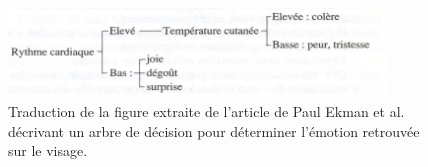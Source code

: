 \begin{figure}
  \centering
  \includegraphics[width=10cm]{./Chapitre1/figures/Ekman1983.png}
  \caption{Traduction de la figure extraite de l'article de Paul Ekman et al.~\cite{Ekman1983} décrivant un arbre de décision pour déterminer l'émotion retrouvée sur le visage.}
  \label{fig:Ekman1983}
\end{figure}
